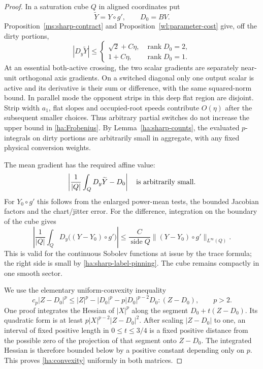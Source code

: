\documentclass[11pt]{article}
\numberwithin{equation}{section}
\theoremstyle{definition}
\theoremstyle{remark}
\DeclareMathOperator{\rank}{rank}
\begin{document}
\begin{proof}
In a saturation cube $Q$ in aligned coordinates put
\[
                  \widetilde Y=Y\circ g',\qquad D_0=BV.
\]
Proposition~\ref{ms:sharp-contract} and
Proposition~\ref{wl:parameter-cost} give, off the dirty portions,
\begin{equation}\label{ha:Frobenius}
 |D_y\widetilde Y|\le
 \begin{cases}
   \sqrt2+C\eta,&\rank D_0=2,\\
   1+C\eta,&\rank D_0=1.
 \end{cases}
\end{equation}
At an essential both-active crossing, the two scalar gradients
are separately near-unit orthogonal axis gradients.  On a switched
diagonal only one output scalar is active and its derivative is
their sum or difference, with the same squared-norm bound.  In
parallel mode the opponent strips in this deep flat region are
disjoint.  Strip width $a_1$, flat slopes and occupied-root speeds
contribute $O(\eta)$ after the subsequent smaller choices.  Thus
arbitrary partial switches do not increase the upper bound in
\eqref{ha:Frobenius}.  By Lemma~\ref{ha:sharp-counts}, the evaluated
$p$-integrals on dirty portions are arbitrarily small in aggregate,
with any fixed physical conversion weights.

The mean gradient has the required affine value:
\begin{equation}\label{ha:mean-gradient}
                \left|\frac{1}{|Q|}\int_Q D_y\widetilde Y-D_0\right|
                      \quad\hbox{is arbitrarily small}.
\end{equation}
For $Y_0\circ g'$ this follows from the enlarged power-mean tests,
the bounded Jacobian factors and the chart/jitter error.  For the
difference, integration on the boundary of the cube gives
\[
 \left|\frac{1}{|Q|}\int_Q D_y\bigl((Y-Y_0)\circ g'\bigr)\right|
       \le \frac{C}{\operatorname{side}Q}
                       \|(Y-Y_0)\circ g'\|_{L^\infty(Q)}.
\]
This is valid for the continuous Sobolev functions at issue by
the trace formula; the right side is small by
\eqref{ha:sharp-label-pinning}.  The cube remains compactly in one
smooth sector.

We use the elementary uniform-convexity inequality
\begin{equation}\label{ha:convexity}
 c_p|Z-D_0|^p\le |Z|^p-|D_0|^p
             -p|D_0|^{p-2}D_0:(Z-D_0),\qquad p>2.
\end{equation}
One proof integrates the Hessian of $|X|^p$ along the segment
$D_0+t(Z-D_0)$.  Its quadratic form is at least
$p|X|^{p-2}|Z-D_0|^2$.  After scaling $|Z-D_0|$ to one, an interval
of fixed positive length in $0\le t\le3/4$ is a fixed positive
distance from the possible zero of the projection of that segment
onto $Z-D_0$.  The integrated Hessian is therefore bounded below
by a positive constant depending only on $p$.  This proves
\eqref{ha:convexity} uniformly in both matrices.


\end{proof}
\end{document}
